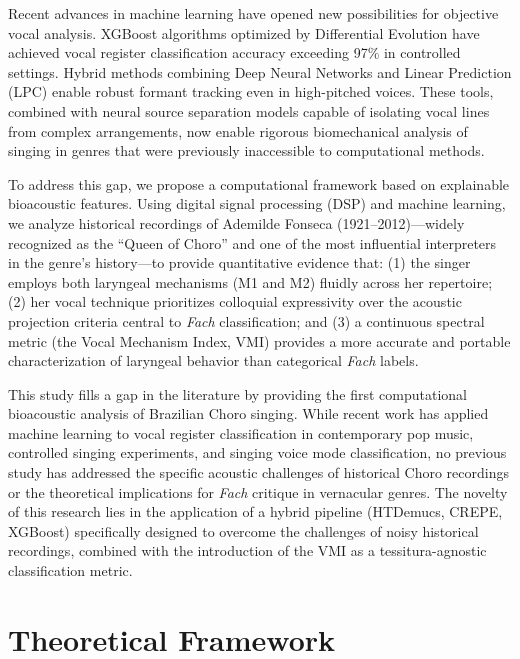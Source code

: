 \documentclass[review,3p,number]{elsarticle}
\begin{document}
Recent advances in machine learning have opened new possibilities for objective
vocal analysis. XGBoost algorithms optimized by Differential Evolution have achieved
vocal register classification accuracy exceeding 97\% in controlled
settings.\cite{boratto2025} Hybrid methods combining Deep Neural Networks and
Linear Prediction (LPC) enable robust formant tracking even in high-pitched
voices.\cite{alku2023,gowda2022} These tools, combined with neural source separation
models capable of isolating vocal lines from complex arrangements,\cite{defossez2021,rouard2023}
now enable rigorous biomechanical analysis of singing in genres that were previously
inaccessible to computational methods.

To address this gap, we propose a computational framework based on explainable
bioacoustic features. Using digital signal processing (DSP) and machine learning, we
analyze historical recordings of Ademilde Fonseca (1921--2012)---widely recognized as
the ``Queen of Choro'' and one of the most influential interpreters in the genre's
history---to provide quantitative evidence that: (1) the singer employs both
laryngeal mechanisms (M1 and M2) fluidly across her repertoire; (2) her vocal
technique prioritizes colloquial expressivity over the acoustic projection criteria
central to \emph{Fach} classification; and (3) a continuous spectral metric (the
Vocal Mechanism Index, VMI) provides a more accurate and portable characterization
of laryngeal behavior than categorical \emph{Fach} labels.

This study fills a gap in the literature by providing the first computational
bioacoustic analysis of Brazilian Choro singing. While recent work has applied
machine learning to vocal register classification in contemporary pop
music,\cite{kim2025} controlled singing experiments,\cite{boratto2025} and singing voice
mode classification,\cite{hinrichs2026} no
previous study has addressed the specific acoustic challenges of historical Choro
recordings or the theoretical implications for \emph{Fach} critique in vernacular
genres. The novelty of this research lies in the application of a hybrid pipeline
(HTDemucs, CREPE, XGBoost) specifically designed to overcome the challenges of noisy
historical recordings, combined with the introduction of the VMI as a
tessitura-agnostic classification metric.

\section{Theoretical Framework}
\label{sec:framework}
\end{document}
